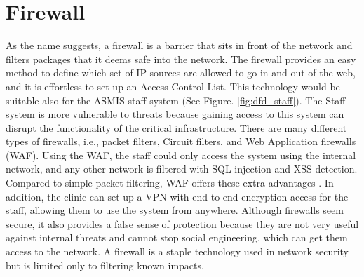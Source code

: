 \section{Firewall}
As the name suggests, a firewall is a barrier that sits in front of the network and filters packages that it deems safe into the network. The firewall provides an easy method to define which set of IP sources are allowed to go in and out of the web, and it is effortless to set up an Access Control List. This technology would be suitable also for the ASMIS staff system (See Figure. \ref{fig:dfd_staff}). The Staff system is more vulnerable to threats because gaining access to this system can disrupt the functionality of the critical infrastructure.\newline\newline
There are many different types of firewalls, i.e., packet filters, Circuit filters, and Web Application firewalls (WAF). Using the WAF, the staff could only access the system using the internal network, and any other network is filtered with SQL injection and XSS detection. Compared to simple packet filtering, WAF offers these extra advantages \citep[p.~354]{thang2020improving}. In addition, the clinic can set up a VPN with end-to-end encryption access for the staff, allowing them to use the system from anywhere.\newline\newline
Although firewalls seem secure, it also provides a false sense of protection because they are not very useful against internal threats and cannot stop social engineering, which can get them access to the network. A firewall is a staple technology used in network security but is limited only to filtering known impacts.